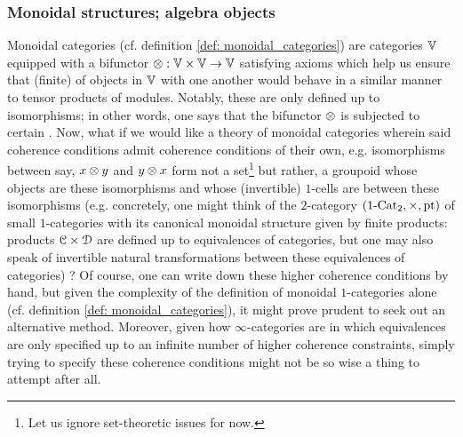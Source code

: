         \subsubsection{Monoidal structures; algebra objects}
            Monoidal categories (cf. definition \ref{def: monoidal_categories}) are categories $\mathbb{V}$ equipped with a bifunctor $\tensor: \V \x \V \to \V$ satisfying axioms which help us ensure that (finite)  of objects in $\mathbb{V}$ with one another would behave in a similar manner to tensor products of modules. Notably, these  are only defined up to isomorphisms; in other words, one says that the bifunctor $\tensor$ is subjected to certain . Now, what if we would like a theory of monoidal categories wherein said coherence conditions admit coherence conditions of their own, e.g. isomorphisms between say, $x \tensor y$ and $y \tensor x$ form not a set\footnote{Let us ignore set-theoretic issues for now.} but rather, a groupoid whose objects are these isomorphisms and whose (invertible) $1$-cells are  between these isomorphisms (e.g. concretely, one might think of the $2$-category $(1\-\Cat_2, \x, \pt)$ of small $1$-categories with its canonical monoidal structure given by finite products: products $\C \x \D$ are defined up to equivalences of categories, but one may also speak of invertible natural transformations between these equivalences of categories) ? Of course, one can write down these higher coherence conditions by hand, but given the complexity of the definition of monoidal $1$-categories alone (cf. definition \ref{def: monoidal_categories}), it might prove prudent to seek out an alternative method. Moreover, given how $\infty$-categories are  in which equivalences are only specified up to an infinite number of higher coherence constraints, simply trying to specify these coherence conditions might not be so wise a thing to attempt after all.
            

